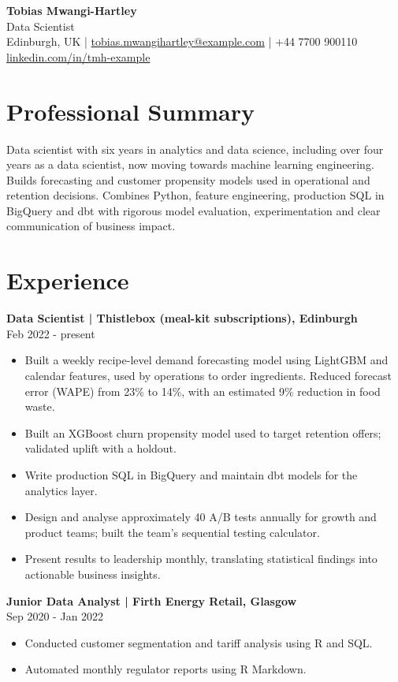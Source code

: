 \documentclass[11pt,a4paper]{article}
\newcommand{\cvsection}[1]{\section*{#1}}
\begin{document}
{\LARGE\bfseries\color{primarycolor} Tobias Mwangi-Hartley}\\[0.2em]
{\large\color{accentcolor} Data Scientist}\\[0.25em]
Edinburgh, UK | \href{mailto:tobias.mwangihartley@example.com}{tobias.mwangihartley@example.com} | +44 7700 900110\\
\href{https://linkedin.com/in/tmh-example}{linkedin.com/in/tmh-example}

\cvsection{Professional Summary}
Data scientist with six years in analytics and data science, including over four years as a data scientist, now moving towards machine learning engineering. Builds forecasting and customer propensity models used in operational and retention decisions. Combines Python, feature engineering, production SQL in BigQuery and dbt with rigorous model evaluation, experimentation and clear communication of business impact.

\cvsection{Experience}
\textbf{Data Scientist | Thistlebox (meal-kit subscriptions), Edinburgh}\\
Feb 2022 - present
\begin{itemize}
\item Built a weekly recipe-level demand forecasting model using LightGBM and calendar features, used by operations to order ingredients. Reduced forecast error (WAPE) from 23\% to 14\%, with an estimated 9\% reduction in food waste.
\item Built an XGBoost churn propensity model used to target retention offers; validated uplift with a holdout.
\item Write production SQL in BigQuery and maintain dbt models for the analytics layer.
\item Design and analyse approximately 40 A/B tests annually for growth and product teams; built the team's sequential testing calculator.
\item Present results to leadership monthly, translating statistical findings into actionable business insights.
\end{itemize}
\textbf{Junior Data Analyst | Firth Energy Retail, Glasgow}\\
Sep 2020 - Jan 2022
\begin{itemize}
\item Conducted customer segmentation and tariff analysis using R and SQL.
\item Automated monthly regulator reports using R Markdown.
\end{itemize}
\end{document}
